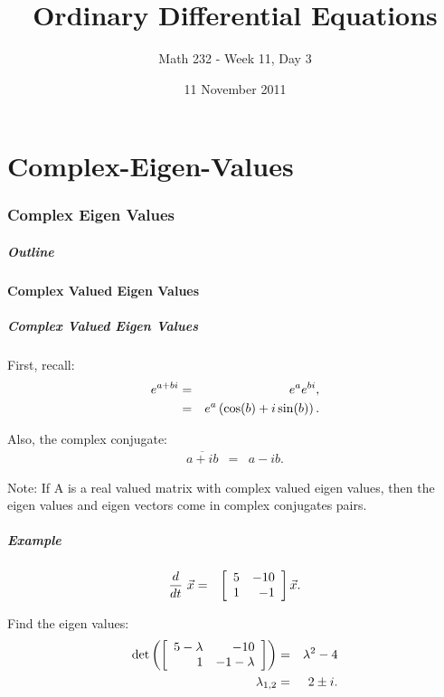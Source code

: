 \part{Complex-Eigen-Values}
\section{Complex Eigen Values}


\title{Ordinary Differential Equations}
\subtitle{Math 232 - Week 11, Day 3}
\date{11 November 2011}

\begin{frame}
  \titlepage
\end{frame}

\begin{frame}
  \frametitle{Outline}
\end{frame}


\subsection{Complex Valued Eigen Values}


\begin{frame}
  \frametitle{Complex Valued Eigen Values}

  First, recall:
  \begin{eqnarray*}
    e^{a+bi} & = & e^a e^{bi}, \\
    & = & e^a \lp \cos(b) + i \sin(b) \rp.
  \end{eqnarray*}

  Also, the complex conjugate:
  \begin{eqnarray*}
    \overline{a+ib} & = & a-i b.
  \end{eqnarray*}

  Note: If A is a real valued matrix with complex valued eigen values,
  then the eigen values and eigen vectors come in complex conjugates
  pairs.

\end{frame}


\begin{frame}
  \frametitle{Example}

  \begin{eqnarray*}
    \deriv{~}{t} \vec{x} & = & \arrayTwo{5}{-10}{1}{-1} \vec{x}.
  \end{eqnarray*}

  {
    Find the eigen values:
    \begin{eqnarray*}
      \det\lp\arrayTwo{5-\lambda}{-10}{1}{-1-\lambda}\rp & = & \lambda^2-4 \\
      \lambda_{1,2} & = & 2 \pm i.
    \end{eqnarray*}
  }

\end{frame}


